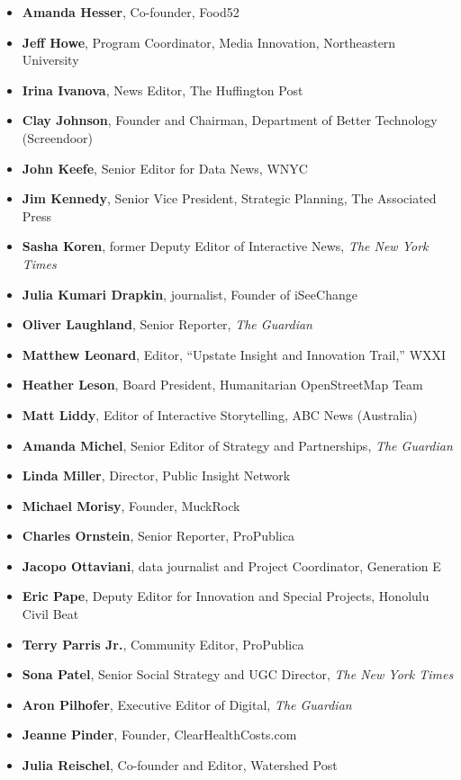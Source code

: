 \documentclass[notoc, symmetric, nobib, nols]{towcenter-guideto-book}
\begin{document}
\begin{itemize}
\item \textbf{Amanda Hesser}, Co-founder, Food52
\item \textbf{Jeff Howe}, Program Coordinator, Media Innovation, Northeastern University
\item \textbf{Irina Ivanova}, News Editor, The Huffington Post
\item \textbf{Clay Johnson}, Founder and Chairman, Department of Better Technology (Screendoor)
\item \textbf{John Keefe}, Senior Editor for Data News, WNYC
\item \textbf{Jim Kennedy}, Senior Vice President, Strategic Planning, The Associated Press
\item \textbf{Sasha Koren}, former Deputy Editor of Interactive News, \textit{The New York Times}
\item \textbf{Julia Kumari Drapkin}, journalist, Founder of iSeeChange
\item \textbf{Oliver Laughland}, Senior Reporter, \textit{The Guardian}
\item \textbf{Matthew Leonard}, Editor, ``Upstate Insight and Innovation Trail,'' WXXI
\item \textbf{Heather Leson}, Board President, Humanitarian OpenStreetMap Team
\item \textbf{Matt Liddy}, Editor of Interactive Storytelling, ABC News (Australia)
\item \textbf{Amanda Michel}, Senior Editor of Strategy and Partnerships, \textit{The Guardian}
\item \textbf{Linda Miller}, Director, Public Insight Network
\item \textbf{Michael Morisy}, Founder, MuckRock
\item \textbf{Charles Ornstein}, Senior Reporter, ProPublica
\item \textbf{Jacopo Ottaviani}, data journalist and Project Coordinator, Generation E
\item \textbf{Eric Pape}, Deputy Editor for Innovation and Special Projects, Honolulu Civil Beat
\item \textbf{Terry Parris Jr.}, Community Editor, ProPublica
\item \textbf{Sona Patel}, Senior Social Strategy and UGC Director, \textit{The New York Times}
\item \textbf{Aron Pilhofer}, Executive Editor of Digital, \textit{The Guardian}
\item \textbf{Jeanne Pinder}, Founder, ClearHealthCosts.com
\item \textbf{Julia Reischel}, Co-founder and Editor, Watershed Post

\end{itemize}
\end{document}
